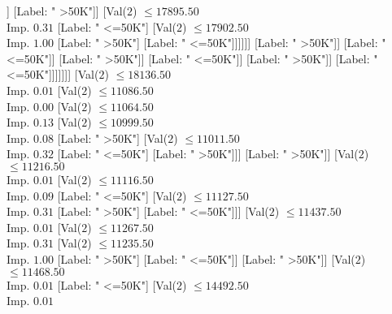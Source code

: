 \documentclass[margin=10pt]{standalone}
\begin{document}
\begin{forest}
																												[Val($2$) $ \leq 17797.50$ \\ Imp. $0.31$
																													[Val($2$) $ \leq 17776.50$ \\ Imp. $1.00$
																														[Label: " >50K"]
																														[Label: " <=50K"]]
																													[Label: " >50K"]]
																												[Val($2$) $ \leq 17895.50$ \\ Imp. $0.31$
																													[Label: " <=50K"]
																													[Val($2$) $ \leq 17902.50$ \\ Imp. $1.00$
																														[Label: " >50K"]
																														[Label: " <=50K"]]]]]]
																									[Label: " >50K"]]
																								[Label: " <=50K"]]
																							[Label: " >50K"]]
																						[Label: " <=50K"]]
																					[Label: " >50K"]]
																				[Label: " <=50K"]]]]]]]
														[Val($2$) $ \leq 18136.50$ \\ Imp. $0.01$
															[Val($2$) $ \leq 11086.50$ \\ Imp. $0.00$
																[Val($2$) $ \leq 11064.50$ \\ Imp. $0.13$
																	[Val($2$) $ \leq 10999.50$ \\ Imp. $0.08$
																		[Label: " >50K"]
																		[Val($2$) $ \leq 11011.50$ \\ Imp. $0.32$
																			[Label: " <=50K"]
																			[Label: " >50K"]]]
																	[Label: " >50K"]]
																[Val($2$) $ \leq 11216.50$ \\ Imp. $0.01$
																	[Val($2$) $ \leq 11116.50$ \\ Imp. $0.09$
																		[Label: " <=50K"]
																		[Val($2$) $ \leq 11127.50$ \\ Imp. $0.31$
																			[Label: " >50K"]
																			[Label: " <=50K"]]]
																	[Val($2$) $ \leq 11437.50$ \\ Imp. $0.01$
																		[Val($2$) $ \leq 11267.50$ \\ Imp. $0.31$
																			[Val($2$) $ \leq 11235.50$ \\ Imp. $1.00$
																				[Label: " >50K"]
																				[Label: " <=50K"]]
																			[Label: " >50K"]]
																		[Val($2$) $ \leq 11468.50$ \\ Imp. $0.01$
																			[Label: " <=50K"]
																			[Val($2$) $ \leq 14492.50$ \\ Imp. $0.01$

\end{forest}
\end{document}
